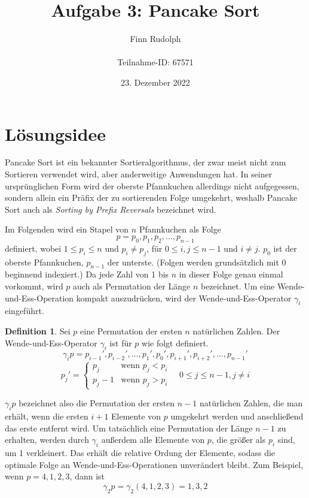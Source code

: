 \documentclass[a4paper, 10pt, ngerman]{article}
\title{\LARGE \textbf{Aufgabe 3: Pancake Sort}}
\author{\large Finn Rudolph \\ \\ \large Teilnahme-ID: 67571}
\date{\large 23. Dezember 2022}
\begin{document}
\begin{titlepage}
    \maketitle
    \tableofcontents
    \thispagestyle{empty}
\end{titlepage}

\newtheorem{theorem}{Satz}
\newtheorem{lemma}{Lemma}
\theoremstyle{definition}
\newtheorem{definition}{Definition}

\section{Lösungsidee}

Pancake Sort ist ein bekannter Sortieralgorithmus, der zwar meist nicht zum Sortieren verwendet wird, aber anderweitige Anwendungen hat. In seiner ursprünglichen Form wird der oberste Pfannkuchen allerdings nicht aufgegessen, sondern allein ein Präfix der zu sortierenden Folge umgekehrt, weshalb Pancake Sort auch als \emph{Sorting by Prefix Reversals} bezeichnet wird.

Im Folgenden wird ein Stapel von $n$ Pfannkuchen als Folge
$$
    p = p_0, p_1, p_2, \dots, p_{n - 1}
$$
definiert, wobei $1 \le p_i \le n$ und $p_i \ne p_j$, für $0 \le i, j \le n-1$ und $i \ne j$. $p_0$ ist der oberste Pfannkuchen, $p_{n - 1}$ der unterste. (Folgen werden grundsätzlich mit 0 beginnend indexiert.) Da jede Zahl von 1 bis $n$ in dieser Folge genau einmal vorkommt, wird $p$ auch als Permutation der Länge $n$ bezeichnet. Um eine Wende-und-Ess-Operation kompakt auszudrücken, wird der Wende-und-Ess-Operator $\gamma_i$ eingeführt.

\begin{definition}
    Sei $p$ eine Permutation der ersten $n$ natürlichen Zahlen. Der Wende-und-Ess-Operator $\gamma_i$ ist für $p$ wie folgt definiert.
    $$
        \gamma_i p = p_{i-1}', p_{i-2}', \dots, p_1', p_0', p_{i+1}', p_{i+2}', \dots, p_{n-1}'
    $$
    $$
        p_j' = \begin{cases}
            p_j     & \text{wenn } p_j < p_i \\
            p_j - 1 & \text{wenn } p_j > p_i
        \end{cases}
        \quad 0 \le j \le n - 1, j \ne i
    $$
\end{definition}
$\gamma_i p$ bezeichnet also die Permutation der ersten $n - 1$ natürlichen Zahlen, die man erhält, wenn die ersten $i+1$ Elemente von $p$ umgekehrt werden und anschließend das erste entfernt wird. Um tatsächlich eine Permutation der Länge $n - 1$ zu erhalten, werden durch $\gamma_i$ außerdem alle Elemente von $p$, die größer als $p_i$ sind, um 1 verkleinert. Das erhält die relative Ordung der Elemente, sodass die optimale Folge an Wende-und-Ess-Operationen unverändert bleibt. Zum Beispiel, wenn $p = 4, 1, 2, 3$, dann ist
$$
    \gamma_2 p = \gamma_2 (4, 1, 2, 3) = 1, 3, 2
$$
\end{document}
